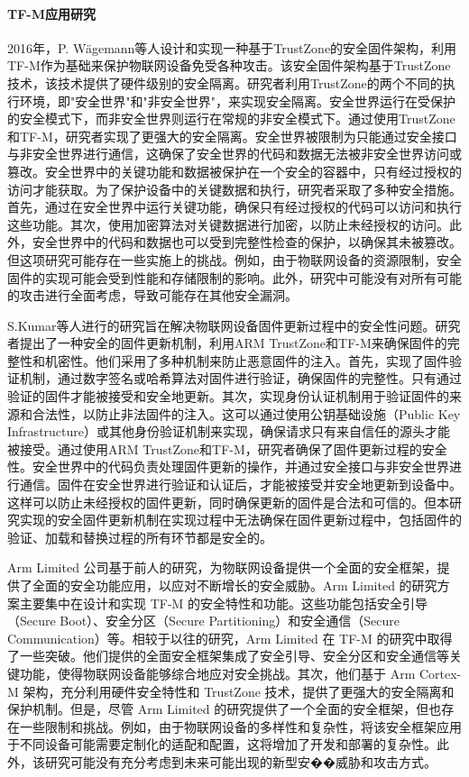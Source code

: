 \documentclass[UTF8,12pt,a4paper,twoside]{ctexart}
\numberwithin{figure}{section}
\begin{document}
\paragraph{TF-M应用研究}
\par 2016年，P. Wägemann等人\cite{trustzone-firmware}设计和实现一种基于TrustZone的安全固件架构，利用TF-M作为基础来保护物联网设备免受各种攻击。该安全固件架构基于TrustZone技术，该技术提供了硬件级别的安全隔离。研究者利用TrustZone的两个不同的执行环境，即"安全世界"和"非安全世界"，来实现安全隔离。安全世界运行在受保护的安全模式下，而非安全世界则运行在常规的非安全模式下。通过使用TrustZone和TF-M，研究者实现了更强大的安全隔离。安全世界被限制为只能通过安全接口与非安全世界进行通信，这确保了安全世界的代码和数据无法被非安全世界访问或篡改。安全世界中的关键功能和数据被保护在一个安全的容器中，只有经过授权的访问才能获取。为了保护设备中的关键数据和执行，研究者采取了多种安全措施。首先，通过在安全世界中运行关键功能，确保只有经过授权的代码可以访问和执行这些功能。其次，使用加密算法对关键数据进行加密，以防止未经授权的访问。此外，安全世界中的代码和数据也可以受到完整性检查的保护，以确保其未被篡改。但这项研究可能存在一些实施上的挑战。例如，由于物联网设备的资源限制，安全固件的实现可能会受到性能和存储限制的影响。此外，研究中可能没有对所有可能的攻击进行全面考虑，导致可能存在其他安全漏洞。
\par S.Kumar等人进行的研究\cite{secure-firmware-updates}旨在解决物联网设备固件更新过程中的安全性问题。研究者提出了一种安全的固件更新机制，利用ARM TrustZone和TF-M来确保固件的完整性和机密性。他们采用了多种机制来防止恶意固件的注入。首先，实现了固件验证机制，通过数字签名或哈希算法对固件进行验证，确保固件的完整性。只有通过验证的固件才能被接受和安全地更新。其次，实现身份认证机制用于验证固件的来源和合法性，以防止非法固件的注入。这可以通过使用公钥基础设施（Public Key Infrastructure）或其他身份验证机制来实现，确保请求只有来自信任的源头才能被接受。通过使用ARM TrustZone和TF-M，研究者确保了固件更新过程的安全性。安全世界中的代码负责处理固件更新的操作，并通过安全接口与非安全世界进行通信。固件在安全世界进行验证和认证后，才能被接受并安全地更新到设备中。这样可以防止未经授权的固件更新，同时确保更新的固件是合法和可信的。但本研究实现的安全固件更新机制在实现过程中无法确保在固件更新过程中，包括固件的验证、加载和替换过程的所有环节都是安全的。
\par  Arm Limited 公司\cite{trusted-firmware}基于前人的研究，为物联网设备提供一个全面的安全框架，提供了全面的安全功能应用，以应对不断增长的安全威胁。Arm Limited 的研究方案主要集中在设计和实现 TF-M 的安全特性和功能。这些功能包括安全引导（Secure Boot）、安全分区（Secure Partitioning）和安全通信（Secure Communication）等。相较于以往的研究，Arm Limited 在 TF-M 的研究中取得了一些突破。他们提供的全面安全框架集成了安全引导、安全分区和安全通信等关键功能，使得物联网设备能够综合地应对安全挑战。其次，他们基于 Arm Cortex-M 架构，充分利用硬件安全特性和 TrustZone 技术，提供了更强大的安全隔离和保护机制。但是，尽管 Arm Limited 的研究提供了一个全面的安全框架，但也存在一些限制和挑战。例如，由于物联网设备的多样性和复杂性，将该安全框架应用于不同设备可能需要定制化的适配和配置，这将增加了开发和部署的复杂性。此外，该研究可能没有充分考虑到未来可能出现的新型安��威胁和攻击方式。
\end{document}

